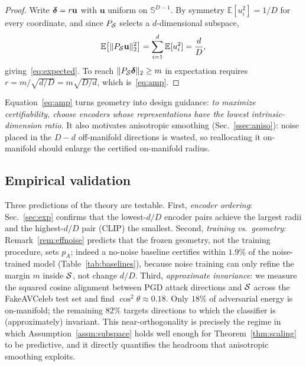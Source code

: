 \begin{proof}
Write ${\boldsymbol \delta}=r\mathbf{u}$ with $\mathbf{u}$ uniform on $\mathbb{S}^{D-1}$. By symmetry $\mathbb{E}[u_i^2]=1/D$ for every coordinate, and since $P_{\mathcal{S}}$ selects a $d$-dimensional subspace,
\begin{equation}
\mathbb{E}\big[\|P_{\mathcal{S}}\mathbf{u}\|_2^2\big]=\sum_{i=1}^{d}\mathbb{E}[u_i^2]=\frac{d}{D},
\end{equation}
giving~\eqref{eq:expected}. To reach $\|P_{\mathcal{S}}{\boldsymbol \delta}\|_2\ge m$ in expectation requires $r=m/\sqrt{d/D}=m\sqrt{D/d}$, which is~\eqref{eq:amp}.
\end{proof}

Equation~\eqref{eq:amp} turns geometry into design guidance: \emph{to maximize certifiability, choose encoders whose representations have the lowest intrinsic-dimension ratio}. It also motivates anisotropic smoothing (Sec.~\ref{ssec:aniso}): noise placed in the $D-d$ off-manifold directions is wasted, so reallocating it on-manifold should enlarge the certified on-manifold radius.

\subsection{Empirical validation}
\label{ssec:theoryval}

Three predictions of the theory are testable. First, \emph{encoder ordering}: Sec.~\ref{sec:exp} confirms that the lowest-$d/D$ encoder pairs achieve the largest radii and the highest-$d/D$ pair (CLIP) the smallest. Second, \emph{training vs.\ geometry}: Remark~\ref{rem:effnoise} predicts that the frozen geometry, not the training procedure, sets $p_A$; indeed a no-noise baseline certifies within $1.9\%$ of the noise-trained model (Table~\ref{tab:baselines}), because noise training can only refine the margin $m$ inside $\mathcal{S}$, not change $d/D$. Third, \emph{approximate invariance}: we measure the squared cosine alignment between PGD attack directions and $\mathcal{S}$ across the FakeAVCeleb test set and find $\cos^2\theta\approx 0.18$. Only $18\%$ of adversarial energy is on-manifold; the remaining $82\%$ targets directions to which the classifier is (approximately) invariant. This near-orthogonality is precisely the regime in which Assumption~\ref{assm:subspace} holds well enough for Theorem~\ref{thm:scaling} to be predictive, and it directly quantifies the headroom that anisotropic smoothing exploits.
